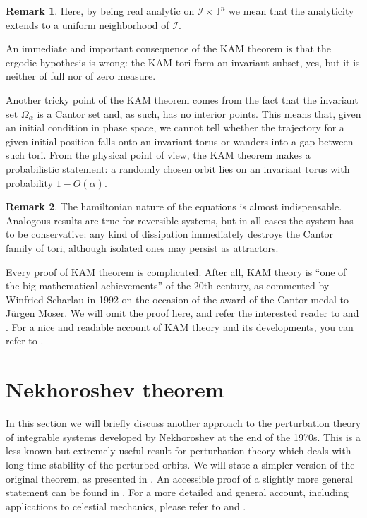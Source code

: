 \documentclass[english,fontsize=11pt,paper=b5]{scrbook}
\numberwithin{equation}{chapter}
\theoremstyle{definition}
\newtheorem{remark}{Remark}[chapter]
\begin{document}
      \begin{remark}
        Here, by being real analytic on $\overline{\mathcal{I}}\times\mathbb{T}^n$ we mean that the analyticity extends to a uniform neighborhood of $\mathcal{I}$.
      \end{remark}

      An immediate and important consequence of the KAM theorem is that the ergodic hypothesis is wrong: the KAM tori form an invariant subset, yes, but it is neither of full nor of zero measure.

      Another tricky point of the KAM theorem comes from the fact that the invariant set $\Omega_\alpha$ is a Cantor set and, as such, has no interior points.
      This means that, given an initial condition in phase space, we cannot tell whether the trajectory for a given initial position falls onto an invariant torus or wanders into a gap between such tori.
      From the physical point of view, the KAM theorem makes a probabilistic statement: a randomly chosen orbit lies on an invariant torus with probability $1-O(\alpha)$.

      \begin{remark}
        The hamiltonian nature of the equations is almost indispensable. Analogous results are true for reversible systems, but in all cases the system has to be conservative:
        any kind of dissipation immediately destroys the Cantor family of tori, although isolated ones may persist as attractors.
      \end{remark}

      Every proof of KAM theorem is complicated.
      After all, KAM theory is ``one of the big mathematical achievements'' of the 20th century, as commented by Winfried Scharlau in 1992 on the occasion of the award of the Cantor medal to J\"urgen Moser.
      We will omit the proof here, and refer the interested reader to \cite[Chapter 15]{book:knauf} and \cite{poschel2001}.
      For a nice and readable account of KAM theory and its developments, you can refer to \cite{Broer2004}.

      \section{Nekhoroshev theorem}

      In this section we will briefly discuss another approach to the perturbation theory of integrable systems developed by Nekhoroshev at the end of the 1970s.
      This is a less known but extremely useful result for perturbation theory which deals with long time stability of the perturbed orbits.
      We will state a simpler version of the original theorem, as presented in \cite{Benettin1985}.
      An accessible proof of a slightly more general statement can be found in \cite{Poschel1993}.
      For a more detailed and general account, including applications to celestial mechanics, please refer to \cite[Chapter 8]{book:celletti} and \cite[Chapter 6]{book:arnoldcelestial}.
\end{document}

